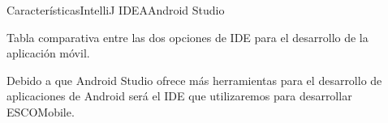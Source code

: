 \begin{tecnologias}{Características}{IntelliJ IDEA}{Android Studio}
	
	\caption{Tabla comparativa entre las dos opciones de IDE para el desarrollo de la aplicación móvil.}
\end{tecnologias}
Debido a que Android Studio ofrece más herramientas para el desarrollo de aplicaciones de Android será el IDE que utilizaremos para desarrollar ESCOMobile.

